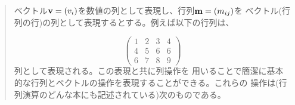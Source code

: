 \begin{quote}
ベクトル\( {\bf v} = (v_i) \)を数値の列として表現し、行列\( {\bf m} = (m_{ij}) \)を
ベクトル(行列の行)の列として表現するとする。例えば以下の行列は、
\begin{comment}

\begin{example}
+-         -+
|  1 2 3 4  |
|  4 5 6 6  |
|  6 7 8 9  |
+-         -+
\end{example}

\end{comment}
\begin{displaymath}
%  
\left(
\begin{array}{cccc}
  1 & 2 & 3 & 4 \\
  4 & 5 & 6 & 6 \\
  6 & 7 & 8 & 9 
\end{array}
\right) 
\end{displaymath}
\noindent
列として表現される。この表現と共に列操作を
用いることで簡潔に基本的な行列とベクトルの操作を表現することができる。これらの
操作は(行列演算のどんな本にも記述されている)次のものである。
\begin{comment}

\begin{example}
                                       __
(dot-product v w)      returns the sum >_i v_i w_i

(matrix-*-vector m v)  returns the vector t,
                                   __
                       where t_i = >_j m_(ij) v_j

(matrix-*-matrix m n)  returns the matrix p,
                                      __
                       where p_(ij) = >_k m_(ik) n_(kj)

(transpose m)          returns the matrix n,
                       where n_(ij) = m_(ji)
\end{example}


\end{comment}
\end{quote}
